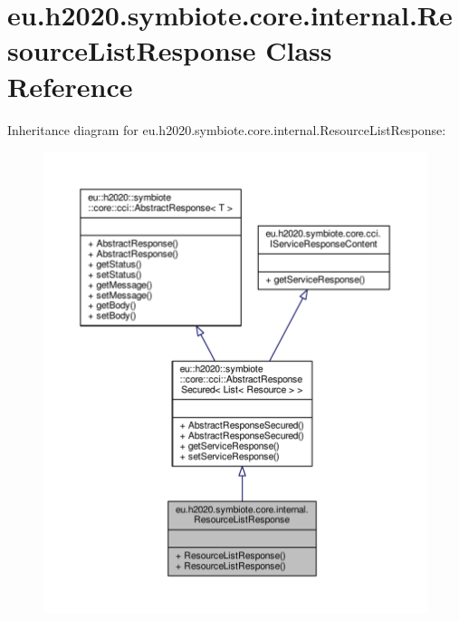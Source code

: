 \hypertarget{classeu_1_1h2020_1_1symbiote_1_1core_1_1internal_1_1ResourceListResponse}{}\section{eu.\+h2020.\+symbiote.\+core.\+internal.\+Resource\+List\+Response Class Reference}
\label{classeu_1_1h2020_1_1symbiote_1_1core_1_1internal_1_1ResourceListResponse}


Inheritance diagram for eu.\+h2020.\+symbiote.\+core.\+internal.\+Resource\+List\+Response\+:\nopagebreak
\begin{figure}[H]
\begin{center}
\leavevmode
\includegraphics[width=350pt]{classeu_1_1h2020_1_1symbiote_1_1core_1_1internal_1_1ResourceListResponse__inherit__graph}
\end{center}
\end{figure}



